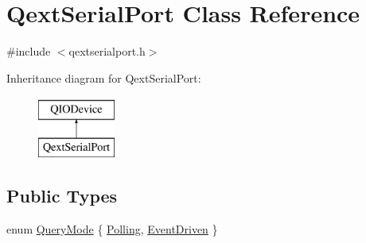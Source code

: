 \hypertarget{class_qext_serial_port}{\section{Qext\-Serial\-Port Class Reference}
\label{class_qext_serial_port}
}


{\ttfamily \#include $<$qextserialport.\-h$>$}

Inheritance diagram for Qext\-Serial\-Port\-:\begin{figure}[H]
\begin{center}
\leavevmode
\includegraphics[height=2.000000cm]{class_qext_serial_port}
\end{center}
\end{figure}
\subsection*{Public Types}
\begin{DoxyCompactItemize}
\item 
enum \hyperlink{class_qext_serial_port_a6002128d7351ea9a958d6a6d1fc6b9bd}{Query\-Mode} \{ \hyperlink{class_qext_serial_port_a6002128d7351ea9a958d6a6d1fc6b9bda5905b78840476fcf303579d27fb1b7b8}{Polling}, 
\hyperlink{class_qext_serial_port_a6002128d7351ea9a958d6a6d1fc6b9bdac03ed747e358e47dbc2b82a8da1d9d0f}{Event\-Driven}
 \}
\end{DoxyCompactItemize}
